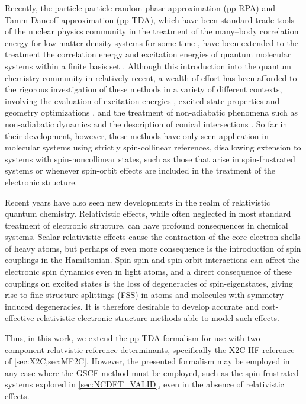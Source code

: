 Recently, the particle-particle random phase approximation (pp-RPA) and 
Tamm-Dancoff approximation (pp-TDA), which have been standard trade tools of 
the nuclear physics community in the treatment of the many--body correlation energy for low matter density 
systems for some time \cite{SchuckBook_04}, 
have been extended to the treatment the correlation energy and excitation energies of quantum 
molecular systems within a finite basis set \cite{Yang13_224105,Yang13_18A522,
Yang13_174110,Yang13_104112,Yang13_030501,Yang09_066403,Bulik13_104113}.  Although this 
introduction into the quantum chemistry community in relatively recent, a wealth 
of effort has been afforded to the rigorous investigation of these methods in a 
variety of different contexts, involving the evaluation of excitation 
energies \cite{Yang13_224105,Yang13_18A522,Yang13_174110}, excited state properties 
and geometry optimizations \cite{Yang15_1025}, and the treatment of non-adiabatic 
phenomena such as non-adiabatic dynamics \cite{Liu14_244105} and the description 
of conical intersections \cite{Yang16_2407}.  So far in their development, however, 
these methods have only seen application in molecular systems using strictly 
spin-collinear references, disallowing extension to systems with 
spin-noncollinear states, such as those that arise in spin-frustrated systems 
or whenever spin-orbit effects are included in the treatment of the electronic structure.


Recent years have also seen new developments in the realm of relativistic quantum 
chemistry.  Relativistic effects, while often neglected in most standard treatment
of electronic structure, can have profound consequences in chemical 
systems.\cite{Pyykko12_45} Scalar relativistic effects cause the contraction of 
the core electron shells of heavy atoms, but perhaps of even more consequence is 
the introduction of spin couplings in the Hamiltonian.  Spin-spin and spin-orbit 
interactions can affect the electronic spin dynamics even in light atoms, and a 
direct consequence of these couplings on excited states is the loss of degeneracies
of spin-eigenstates, giving rise to fine structure splittings (FSS) in atoms and 
molecules with symmetry-induced degeneracies. It is therefore desirable to develop accurate and 
cost-effective relativistic electronic structure methods able to model such effects. 


Thus, in this work, we extend the pp-TDA formalism for use with two--component
relatvistic reference determinants, specifically the X2C-HF reference of \cref{sec:X2C,sec:MF2C}. 
However, the presented formalism may be employed in any case where the GSCF method must be
employed, such as the spin-frustrated systems explored in \cref{sec:NCDFT_VALID},
even in the absence of relativistic effects. 




